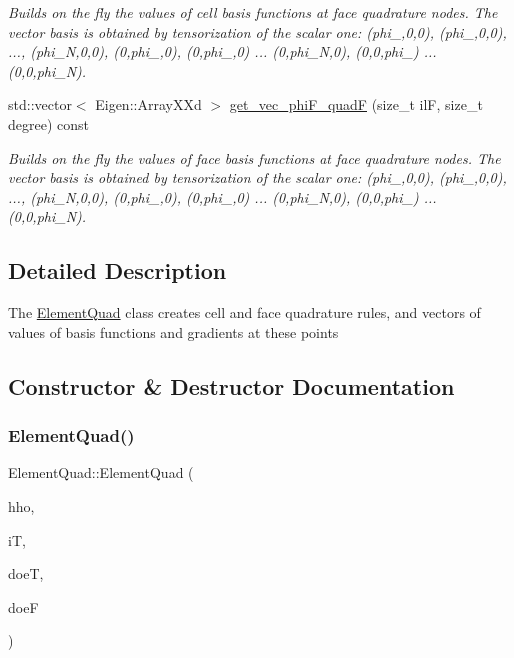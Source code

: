 \begin{DoxyCompactItemize}
\begin{DoxyCompactList}\small\item\em Builds on the fly the values of cell basis functions at face quadrature nodes. The vector basis is obtained by tensorization of the scalar one\+: (phi\+\_,0,0), (phi\+\_,0,0), ..., (phi\+\_\+N,0,0), (0,phi\+\_,0), (0,phi\+\_,0) ... (0,phi\+\_\+N,0), (0,0,phi\+\_) ... (0,0,phi\+\_\+N). \end{DoxyCompactList}\item 
std\+::vector$<$ Eigen\+::\+Array\+X\+Xd $>$ \hyperlink{classHArDCore3D_1_1ElementQuad_a1a9a6bf14079608b3f706136568d3e7d}{get\+\_\+vec\+\_\+phi\+F\+\_\+quadF} (size\+\_\+t ilF, size\+\_\+t degree) const
\begin{DoxyCompactList}\small\item\em Builds on the fly the values of face basis functions at face quadrature nodes. The vector basis is obtained by tensorization of the scalar one\+: (phi\+\_,0,0), (phi\+\_,0,0), ..., (phi\+\_\+N,0,0), (0,phi\+\_,0), (0,phi\+\_,0) ... (0,phi\+\_\+N,0), (0,0,phi\+\_) ... (0,0,phi\+\_\+N). \end{DoxyCompactList}\end{DoxyCompactItemize}


\subsection{Detailed Description}
The \hyperlink{classHArDCore3D_1_1ElementQuad}{Element\+Quad} class creates cell and face quadrature rules, and vectors of values of basis functions and gradients at these points 

\subsection{Constructor \& Destructor Documentation}
\mbox{\label{classHArDCore3D_1_1ElementQuad_a0d27ba99f9f3e6f2a3e5311e6be19eba}} 
\subsubsection{\texorpdfstring{Element\+Quad()}{ElementQuad()}}
{\footnotesize\ttfamily Element\+Quad\+::\+Element\+Quad (\begin{DoxyParamCaption}\item[{const \hyperlink{classHArDCore3D_1_1HybridCore}{Hybrid\+Core} \&}]{hho,  }\item[{const size\+\_\+t}]{iT,  }\item[{const size\+\_\+t}]{doeT,  }\item[{const size\+\_\+t}]{doeF }\end{DoxyParamCaption})}




